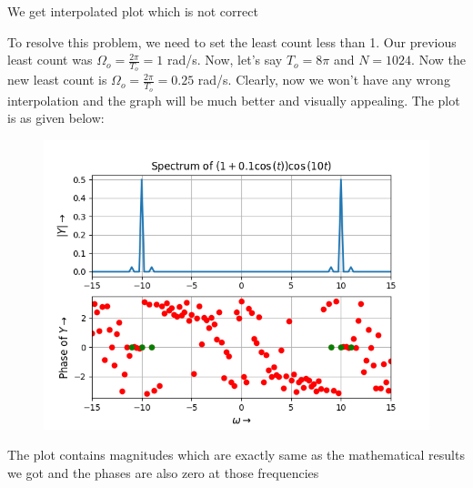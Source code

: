 \documentclass[12pt, a4paper]{article}
\begin{document}
\begin{center}
    We get interpolated plot which is not correct
\end{center}
To resolve this problem, we need to set the least count less than 1. Our previous least count was $\Omega_{o} = \frac{2\pi}{T_{o}} = 1$ rad/s. Now, let's say $T_{o} = 8\pi$ and $N=1024$. Now the new least count is $\Omega_{o} = \frac{2\pi}{T_{o}} = 0.25$ rad/s. Clearly, now we won't have any wrong interpolation and the graph will be much better and visually appealing. The plot is as given below:
\vspace*{-0.5cm}
\begin{figure}[H]
    \centering
    \includegraphics[scale = 0.8]{Figure_4.png}
    \label{fig:sample}
\end{figure}
\begin{center}
    The plot contains magnitudes which are exactly same as the mathematical results we got and the phases are also zero at those frequencies
\end{center}
\end{document}
